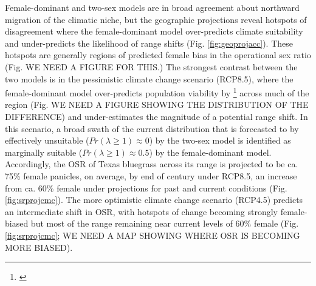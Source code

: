 \documentclass[12pt]{article}\usepackage[]{graphicx}\usepackage[dvipsnames]{xcolor}
\newcommand{\tom}[2]{{\color{red}{#1}}\footnote{\textit{\color{red}{#2}}}}
\begin{document}
Female-dominant and two-sex models are in broad agreement about northward migration of the climatic niche, but the geographic projections reveal hotspots of disagreement where the female-dominant model over-predicts climate suitability and under-predicts the likelihood of range shifts (Fig. \ref{fig:geoprojacc}). 
These hotspots are generally regions of predicted female bias in the operational sex ratio (Fig. WE NEED A FIGURE FOR THIS.) 
The strongest contrast between the two models is in the pessimistic climate change scenario (RCP8.5), where the female-dominant model over-predicts population viability by \tom{ca. 25\%}{I just eyeballed this. Real number should come from the histograms.} across much of the region (Fig. WE NEED A FIGURE SHOWING THE DISTRIBUTION OF THE DIFFERENCE) and under-estimates the magnitude of a potential range shift. 
In this scenario, a broad swath of the current distribution that is forecasted to by effectively unsuitable ($Pr(\lambda \ge 1) \approx 0$) by the two-sex model is identified as marginally suitable ($Pr(\lambda \ge 1) \approx 0.5$) by the female-dominant model. 
Accordingly, the OSR of Texas bluegrass across its range is projected to be ca. 75\% female panicles, on average, by end of century under RCP8.5, an increase from ca. 60\% female under projections for past and current conditions (Fig. \ref{fig:srprojcmc}). 
The more optimistic climate change scenario (RCP4.5) predicts an intermediate shift in OSR, with hotspots of change becoming strongly female-biased but most of the range remaining near current levels of 60\% female (Fig. \ref{fig:srprojcmc}; WE NEED A MAP SHOWING WHERE OSR IS BECOMING MORE BIASED). 
\end{document}
